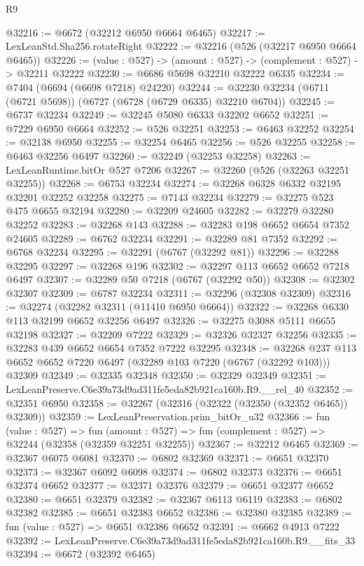 \begin{lexlean}{R9}
\begin{coremodule}
@32216 := @6672 (@32212 @6950 @6664 @6465)
@32217 := LexLeanStd.Sha256.rotateRight
@32222 := @32216 (@526 (@32217 @6950 @6664 @6465))
@32226 := (value : @527) -> (amount : @527) -> (complement : @527) -> @32211 @32222
@32230 := @6686 @5698 @32210 @32222 @6335
@32234 := @7404 (@6694 (@6698 @7218) @24220)
@32244 := @32230 @32234 (@6711 (@6721 @5698)) (@6727 (@6728 (@6729 @6335) @32210 @6704))
@32245 := @6737 @32234
@32249 := @32245 @5080 @6333 @32202 @6652
@32251 := @7229 @6950 @6664
@32252 := @526 @32251
@32253 := @6463 @32252
@32254 := @32138 @6950
@32255 := @32254 @6465
@32256 := @526 @32255
@32258 := @6463 @32256 @6497
@32260 := @32249 (@32253 @32258)
@32263 := LexLeanRuntime.bitOr @527 @7206
@32267 := @32260 (@526 (@32263 @32251 @32255))
@32268 := @6753 @32234
@32274 := @32268 @6328 @6332 @32195 @32201 @32252 @32258
@32275 := @7143 @32234
@32279 := @32275 @523 @475 @6655 @32194
@32280 := @32209 @24605
@32282 := @32279 @32280 @32252
@32283 := @32268 @143
@32288 := @32283 @198 @6652 @6654 @7352 @24605
@32289 := @6762 @32234
@32291 := @32289 @81 @7352
@32292 := @6768 @32234
@32295 := @32291 (@6767 (@32292 @81))
@32296 := @32288 @32295
@32297 := @32268 @196
@32302 := @32297 @113 @6652 @6652 @7218 @6497
@32307 := @32289 @50 @7218 (@6767 (@32292 @50))
@32308 := @32302 @32307
@32309 := @6787 @32234
@32311 := @32296 (@32308 @32309)
@32316 := @32274 (@32282 @32311 (@11410 @6950 @6664))
@32322 := @32268 @6330 @113 @32199 @6652 @32256 @6497
@32326 := @32275 @3088 @5111 @6655 @32198
@32327 := @32209 @7222
@32329 := @32326 @32327 @32256
@32335 := @32283 @439 @6652 @6654 @7352 @7222 @32295
@32348 := @32268 @237 @113 @6652 @6652 @7220 @6497 (@32289 @103 @7220 (@6767 (@32292 @103))) @32309
@32349 := @32335 @32348
@32350 := @32329 @32349
@32351 := LexLeanPreserve.C6e39a73d9ad311fe5eda82b921ca160b.R9.__rel_40
@32352 := @32351 @6950
@32358 := @32267 (@32316 (@32322 (@32350 (@32352 @6465)) @32309))
@32359 := LexLeanPreservation.prim_bitOr_u32
@32366 := fun (value : @527) =>
  fun (amount : @527) => fun (complement : @527) => @32244 (@32358 (@32359 @32251 @32255))
@32367 := @32212 @6465
@32369 := @32367 @6075 @6081
@32370 := @6802 @32369
@32371 := @6651 @32370
@32373 := @32367 @6092 @6098
@32374 := @6802 @32373
@32376 := @6651 @32374 @6652
@32377 := @32371 @32376
@32379 := @6651 @32377 @6652
@32380 := @6651 @32379
@32382 := @32367 @6113 @6119
@32383 := @6802 @32382
@32385 := @6651 @32383 @6652
@32386 := @32380 @32385
@32389 := fun (value : @527) => @6651 @32386 @6652
@32391 := @6662 @4913 @7222
@32392 := LexLeanPreserve.C6e39a73d9ad311fe5eda82b921ca160b.R9.__fits_33
@32394 := @6672 (@32392 @6465)

\end{coremodule}
\end{lexlean}
